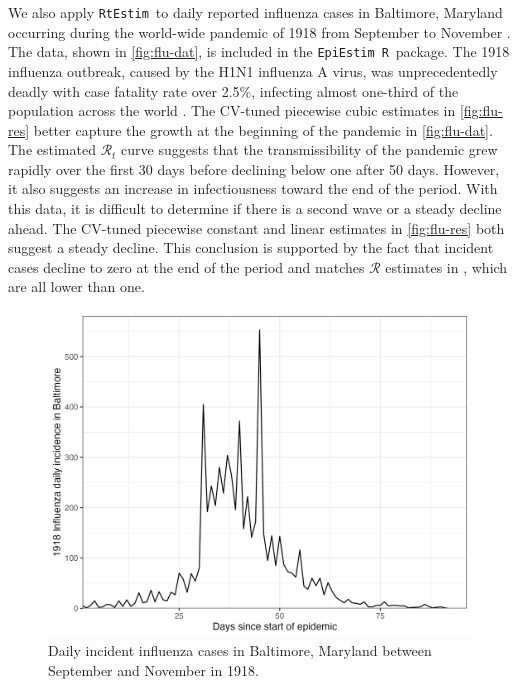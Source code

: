\documentclass[10pt,letterpaper]{article}
\newcommand{\R}{\texttt{R}}
\def\RtEstim{\texttt{RtEstim}}
\def\EpiEstim{\texttt{EpiEstim}}
\def\calR{\mathcal{R}}
\newcommand{\citep}[1]{\cite{#1}}
\begin{document}
We also apply \RtEstim\ to daily reported influenza cases in Baltimore, Maryland
occurring during the world-wide pandemic of 1918 from September to November 
\citep{frost1919influenza}. The
data, shown in \autoref{fig:flu-dat}, is included in the \EpiEstim\ \R\ package.
The 1918 influenza outbreak, caused by the H1N1 influenza A virus, was
unprecedentedly deadly with case fatality rate over 2.5\%, infecting almost
one-third of the population across the world \citep{taubenberger20061918}. The
CV-tuned piecewise cubic estimates in \autoref{fig:flu-res} better capture the
growth at the beginning of the pandemic in \autoref{fig:flu-dat}. The estimated
$\calR_t$ curve suggests that the transmissibility of the pandemic grew rapidly
over the first 30 days before declining below one after 50 days. However, it
also suggests an increase in infectiousness toward the end of the period. With
this data, it is difficult to determine if there is a second wave or a steady
decline ahead. The CV-tuned piecewise constant and linear estimates in
\autoref{fig:flu-res} both suggest a steady decline. This conclusion is
supported by the fact that incident cases decline to zero at the end of the
period and matches $\calR$ estimates in \cite{cori2013new}, which are all lower
than one.

\begin{figure}[!ht]
  \centering
  \includegraphics[width=0.8\linewidth]{fig/flu_dat.png}
  \caption{Daily incident influenza cases in Baltimore, Maryland between September 
  and November in 1918.} 
  \label{fig:flu-dat}
\end{figure} 
\end{document}

